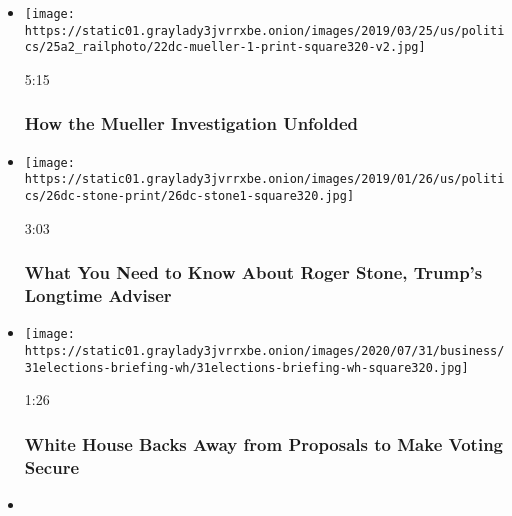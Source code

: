 \begin{itemize}
\item
  \href{https://www.nytimes3xbfgragh.onion/video/us/politics/100000006381390/robert-mueller-report-background.html?action=click\&module=video-series-bar\&region=header\&pgtype=Article\&playlistId=video/us-politics}{}

  \texttt{[image: https://static01.graylady3jvrrxbe.onion/images/2019/03/25/us/politics/25a2\_railphoto/22dc-mueller-1-print-square320-v2.jpg]}

  5:15

  \hypertarget{how-the-mueller-investigation-unfolded}{%
  \subsubsection{How the Mueller Investigation
  Unfolded}\label{how-the-mueller-investigation-unfolded}}
\item
  \href{https://www.nytimes3xbfgragh.onion/video/us/politics/100000006236443/who-is-roger-stone.html?action=click\&module=video-series-bar\&region=header\&pgtype=Article\&playlistId=video/us-politics}{}

  \texttt{[image: https://static01.graylady3jvrrxbe.onion/images/2019/01/26/us/politics/26dc-stone-print/26dc-stone1-square320.jpg]}

  3:03

  \hypertarget{what-you-need-to-know-about-roger-stone-trumps-longtime-adviser}{%
  \subsubsection{What You Need to Know About Roger Stone, Trump's
  Longtime
  Adviser}\label{what-you-need-to-know-about-roger-stone-trumps-longtime-adviser}}
\item
  \href{https://www.nytimes3xbfgragh.onion/video/us/100000007267362/white-house-mail-in-ballots-election.html?action=click\&module=video-series-bar\&region=header\&pgtype=Article\&playlistId=video/us-politics}{}

  \texttt{[image: https://static01.graylady3jvrrxbe.onion/images/2020/07/31/business/31elections-briefing-wh/31elections-briefing-wh-square320.jpg]}

  1:26

  \hypertarget{white-house-backs-away-from-proposals-to-make-voting-secure}{%
  \subsubsection{White House Backs Away from Proposals to Make Voting
  Secure}\label{white-house-backs-away-from-proposals-to-make-voting-secure}}
\item
  \href{https://www.nytimes3xbfgragh.onion/video/us/politics/100000007265038/trump-inhofe-audio-call.html?action=click\&module=video-series-bar\&region=header\&pgtype=Article\&playlistId=video/us-politics}{}


\end{itemize}
